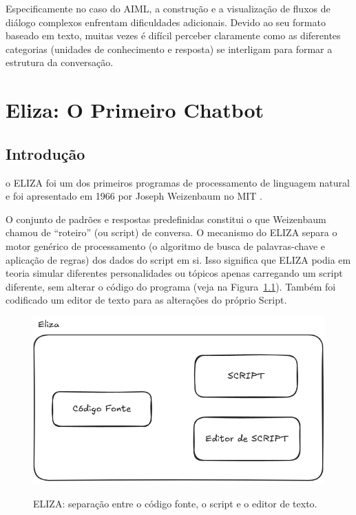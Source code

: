 \documentclass[14pt,a4paper,oneside]{book}
\begin{document}
Especificamente no caso do AIML, a construção e a visualização de fluxos de diálogo complexos enfrentam dificuldades adicionais. Devido ao seu formato baseado em texto, muitas vezes é difícil perceber claramente como as diferentes categorias (unidades de conhecimento e resposta) se interligam para formar a estrutura da conversação.



\chapter{Eliza: O Primeiro Chatbot}

\section{Introdução}

o ELIZA foi um dos primeiros programas de processamento de linguagem natural e foi apresentado em 1966 por Joseph Weizenbaum no MIT \cite{Weizenbaum1996}.

O conjunto de padrões e respostas predefinidas constitui o que Weizenbaum chamou de “roteiro” (ou script) de conversa. O mecanismo do ELIZA separa o motor genérico de processamento (o algoritmo de busca de palavras-chave e aplicação de regras) dos dados do script em si. Isso significa que ELIZA podia em teoria simular diferentes personalidades ou tópicos apenas carregando um script diferente, sem alterar o código do programa (veja na Figura~\ref{fig:elizaeditor}). Também foi codificado um editor de texto para as alterações do próprio Script.

\begin{figure}[!htbp]
	\centering	
	\caption{ELIZA: separação entre o código fonte, o script e o editor de texto.}
	\includegraphics[width=0.9\linewidth]{./fig/eliza.png}
	\label{fig:elizaeditor}
\end{figure}
\end{document}
